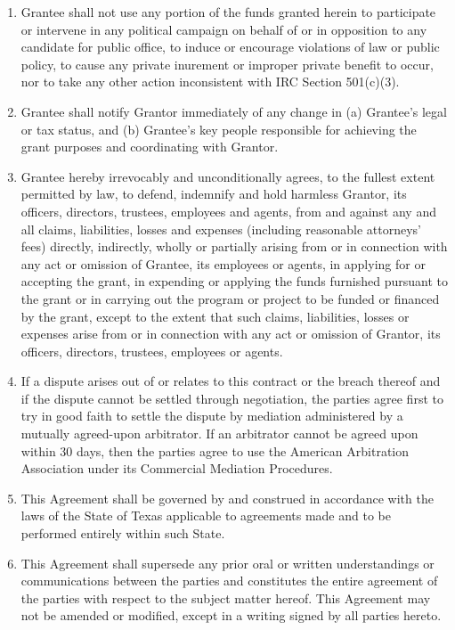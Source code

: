 \documentclass[english,letterpaper,12pt]{article}
\begin{document}
\begin{enumerate}
\item Grantee shall not use any portion of the funds granted herein to participate or intervene in any political campaign on behalf of or in opposition to any candidate for public office, to induce or encourage violations of law or public policy, to cause any private inurement or improper private benefit to occur, nor to take any other action inconsistent with IRC Section 501(c)(3). 

\item Grantee shall notify Grantor immediately of any change in (a) Grantee's legal or tax status, and (b) Grantee's key people responsible for achieving the grant purposes and coordinating with Grantor.  

\item Grantee hereby irrevocably and unconditionally agrees, to the fullest extent permitted by law, to defend, indemnify and hold harmless Grantor, its officers, directors, trustees, employees and agents, from and against any and all claims, liabilities, losses and expenses (including reasonable attorneys' fees) directly, indirectly, wholly or partially arising from or in connection with any act or omission of Grantee, its employees or agents, in applying for or accepting the grant, in expending or applying the funds furnished pursuant to the grant or in carrying out the program or project to be funded or financed by the grant, except to the extent that such claims, liabilities, losses or expenses arise from or in connection with any act or omission of Grantor, its officers, directors, trustees, employees or agents. 

\item If a dispute arises out of or relates to this contract or the breach thereof and if the dispute cannot be settled through negotiation, the parties agree first to try in good faith to settle the dispute by mediation administered by a mutually agreed-upon arbitrator.  If an arbitrator cannot be agreed upon within 30 days, then the parties agree to use the American Arbitration Association under its Commercial Mediation Procedures.

\item This Agreement shall be governed by and construed in accordance with the laws of the State of Texas applicable to agreements made and to be performed entirely within such State.

\item This Agreement shall supersede any prior oral or written understandings or communications between the parties and constitutes the entire agreement of the parties with respect to the subject matter hereof. This Agreement may not be amended or modified, except in a writing signed by all parties hereto. 


\end{enumerate}
\end{document}
